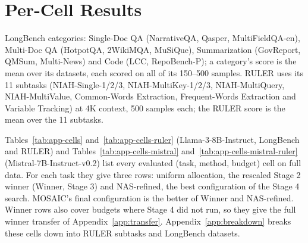 \clearpage
\appendix
\makeatletter
\setlength{\@fptop}{0pt}\setlength{\@fpsep}{14pt}\setlength{\@fpbot}{0pt plus 1fil}
\setlength{\@dblfptop}{0pt}\setlength{\@dblfpsep}{14pt}\setlength{\@dblfpbot}{0pt plus 1fil}
\makeatother
\renewcommand{\topfraction}{0.97}\renewcommand{\bottomfraction}{0.9}\renewcommand{\textfraction}{0.03}
\renewcommand{\floatpagefraction}{0.85}\renewcommand{\dbltopfraction}{0.97}\renewcommand{\dblfloatpagefraction}{0.85}
\setcounter{topnumber}{4}\setcounter{dbltopnumber}{3}\setcounter{totalnumber}{6}

\section{Per-Cell Results}
\label{app:cells}


LongBench categories: Single-Doc QA (NarrativeQA, Qasper, MultiFieldQA-en), Multi-Doc QA (HotpotQA, 2WikiMQA, MuSiQue), Summarization (GovReport, QMSum, Multi-News) and Code (LCC, RepoBench-P); a category's score is the mean over its datasets, each scored on all of its 150--500 samples. RULER uses its 11 subtasks (NIAH-Single-1/2/3, NIAH-MultiKey-1/2/3, NIAH-MultiQuery, NIAH-MultiValue, Common-Words Extraction, Frequent-Words Extraction and Variable Tracking) at 4K context, 500 samples each; the RULER score is the mean over the 11 subtasks.

Tables~\ref{tab:app-cells} and~\ref{tab:app-cells-ruler} (Llama-3-8B-Instruct, LongBench and RULER) and Tables~\ref{tab:app-cells-mistral} and~\ref{tab:app-cells-mistral-ruler} (Mistral-7B-Instruct-v0.2) list every evaluated (task, method, budget) cell on full data. For each task they give three rows: uniform allocation, the rescaled Stage 2 winner (Winner, Stage 3) and NAS-refined, the best configuration of the Stage 4 search. MOSAIC's final configuration is the better of Winner and NAS-refined. Winner rows also cover budgets where Stage 4 did not run, so they give the full winner transfer of Appendix~\ref{app:transfer}. Appendix~\ref{app:breakdown} breaks these cells down into RULER subtasks and LongBench datasets.


